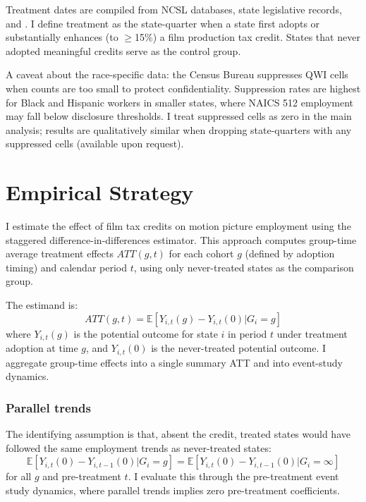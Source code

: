 \documentclass[12pt]{article}
\newcommand{\E}{\mathbb{E}}
\begin{document}
Treatment dates are compiled from NCSL databases, state legislative records, and \citet{Button2019}. I define treatment as the state-quarter when a state first adopts or substantially enhances (to $\geq$15\%) a film production tax credit. States that never adopted meaningful credits serve as the control group.

A caveat about the race-specific data: the Census Bureau suppresses QWI cells when counts are too small to protect confidentiality. Suppression rates are highest for Black and Hispanic workers in smaller states, where NAICS 512 employment may fall below disclosure thresholds. I treat suppressed cells as zero in the main analysis; results are qualitatively similar when dropping state-quarters with any suppressed cells (available upon request).



\section{Empirical Strategy}

I estimate the effect of film tax credits on motion picture employment using the \citet{CallawayS2021} staggered difference-in-differences estimator. This approach computes group-time average treatment effects $ATT(g,t)$ for each cohort $g$ (defined by adoption timing) and calendar period $t$, using only never-treated states as the comparison group.

The estimand is:
\begin{equation}
ATT(g,t) = \E[Y_{i,t}(g) - Y_{i,t}(0) | G_i = g]
\end{equation}
where $Y_{i,t}(g)$ is the potential outcome for state $i$ in period $t$ under treatment adoption at time $g$, and $Y_{i,t}(0)$ is the never-treated potential outcome. I aggregate group-time effects into a single summary ATT and into event-study dynamics.

\subsubsection*{Parallel trends} The identifying assumption is that, absent the credit, treated states would have followed the same employment trends as never-treated states:
\begin{equation}
\E[Y_{i,t}(0) - Y_{i,t-1}(0) | G_i = g] = \E[Y_{i,t}(0) - Y_{i,t-1}(0) | G_i = \infty]
\end{equation}
for all $g$ and pre-treatment $t$. I evaluate this through the pre-treatment event study dynamics, where parallel trends implies zero pre-treatment coefficients.
\end{document}
